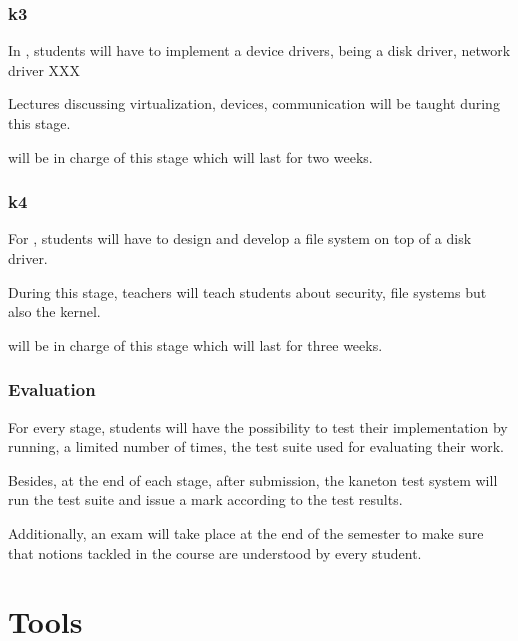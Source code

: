 
\begin{frame}
  \frametitle{k3}

  In , students will have to implement a device drivers, being
  a disk driver, network driver \etc{} XXX

  \-

  Lectures discussing virtualization, devices, communication \etc{} will
  be taught during this stage.

  \-

   will be in charge of this stage which will last for
  two weeks.
\end{frame}


\begin{frame}
  \frametitle{k4}

  For , students will have to design and develop a file system
  on top of a disk driver.

  \-

  During this stage, teachers will teach students about security, file systems
  but also the  kernel.

  \-

   will be in charge of this stage which will last for
  three weeks.
\end{frame}


\begin{frame}
  \frametitle{Evaluation}

  For every stage, students will have the possibility to test their
  implementation by running, a limited number of times, the test suite used
  for evaluating their work.

  \-

  Besides, at the end of each stage, after submission, the kaneton test system
  will run the test suite and issue a mark according to the test results.

  \-

  Additionally, an exam will take place at the end of the semester to make
  sure that notions tackled in the course are understood by every student.
\end{frame}

%
%

\section{Tools}

